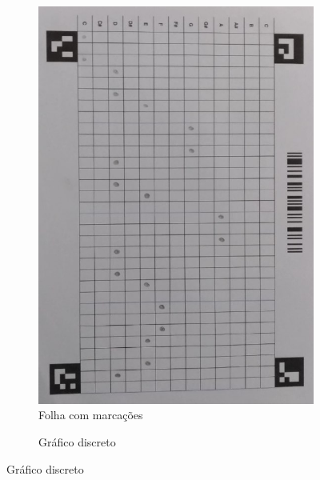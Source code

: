 \documentclass[12pt]{report}
\begin{document}
{\begin{figure}[H]
  \centering
  \begin{subfigure}{0.4\textwidth}
    \centering
    \includegraphics[angle=90,origin=c,width=1\textwidth]{imagens/layout_preenchido.jpeg}
    \caption{Folha com marcações}
    \label{fig:layout_marcacao}
  \end{subfigure}
  \begin{subfigure}{0.5\textwidth}
    \centering
    \caption{Gráfico discreto}
    \label{fig:gráfico}
  \end{subfigure}%
\end{figure}


}
\end{document}
